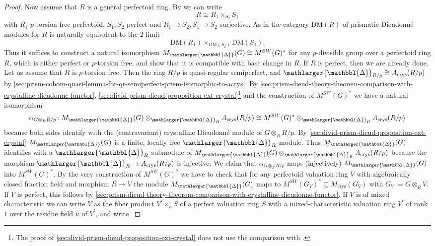 \documentclass{amsart}
\newcommand{\prism}{{\mathlarger{\mathbbl{\Delta}}}}
\theoremstyle{plain}
\theoremstyle{definition}
\newcommand{\crys}{\mathrm{crys}}
\newcommand{\DM}{\mathrm{DM}}
\newcommand{\red}[1]{{\color{black} #1}}
\begin{document}
\begin{proof}
  \red{Now assume that $R$ is a general perfectoid ring. By \cite[Remark 8.8]{lau_dieudonne_theory_over_semiperfect_rings_and_perfectoid_rings} we can write
    \[
      R\cong R_1\times_{S_2}S_1
    \]
    with $R_1$ $p$-torsion free perfectoid, $S_1,S_2$ perfect and $R_1\to S_2, S_1\to S_2$ surjective. As in \cite[Lemma 9.2]{lau_dieudonne_theory_over_semiperfect_rings_and_perfectoid_rings} the category $\DM(R)$ of prismatic Dieudonn\'e modules for $R$ is naturally equivalent to the $2$-limit
    \[
      \DM(R_1)\times_{\DM(S_2)}\DM(S_1).
    \]
    Thus it suffices to construct a natural isomorphism $M_\prism(G)\cong M^{SW}(G)^\ast$ for any $p$-divisible group over a perfectoid ring $R$, which is either perfect or $p$-torsion free, and show that it is compatible with base change in $R$. If $R$ is perfect, then we are already done. Let us assume that $R$ is $p$-torsion free. Then the ring $R/p$ is quasi-regular semiperfect, and $\prism_{R/p}\cong A_\crys(R/p)$ by \ref{sec:prism-cohom-quasi-lemma-for-qr-semiperfect-prism-isomorphic-to-acrys}. By \ref{sec:prism-dieud-theory-theorem-comparison-with-crystalline-dieudonne-functor}, \ref{sec:divid-prism-dieud-proposition-ext-crystal}\footnote{The proof of \ref{sec:divid-prism-dieud-proposition-ext-crystal} does not use the comparison with \cite{scholze2020berkeley}.} and the construction of $M^{SW}(G)^\ast$ we have a natural isomorphism
    \[
      \alpha_{G\otimes_{R} R/p}\colon M_\prism(G)\otimes_{\prism_R}A_\crys(R/p) \cong M^{SW}(G)^\ast\otimes_{\prism_R} A_\crys(R/p)
    \]
    because both sides identify with the (contravariant) crystalline Dieudonn\'e module of $G\otimes_R R/p$. By \ref{sec:divid-prism-dieud-proposition-ext-crystal} $M_\prism(G)$ is a finite, locally free $\prism_R$-module. Thus $M_\prism(G)$ identifies with a $\prism_R$-submodule of $M_\prism(G)\otimes_{\prism_R}A_\crys(R/p)$ because the morphism $\prism_R\to A_\crys(R/p)$ is injective. We claim that $\alpha_{G\otimes_R R/p}$ maps (injectively) $M_\prism(G)$ into $M^{SW}(G)^\ast$.
    By the very construction of $M^{SW}(G)^\ast$ we have to check that for any perfectoid valuation ring $V$ with algebraically closed fraction field and morphism $R\to V$ the module $M_\prism(G)$ maps to $M^{SW}(G_V)^\ast\subseteq M_\crys(G_V)$ with $G_V:=G\otimes_R V$. If $V$ is perfect, this follows by \ref{sec:prism-dieud-theory-theorem-comparison-with-crystalline-dieudonne-functor}. If $V$ is of mixed characteristic we can write $V$ as the fiber product $V^\prime\times_{\kappa} S$ of a perfect valuation ring $S$ with a mixed-characteristic valuation ring $V^\prime$ of rank $1$ over the residue field $\kappa$ of $V^\prime$, and write
}
\end{proof}
\end{document}
